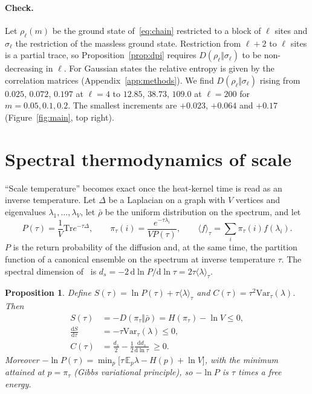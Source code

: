 \documentclass[11pt]{article}
\newtheorem{proposition}{Proposition}[section]
\theoremstyle{remark}\newtheorem*{remark}{Remark}
\newcommand{\dd}{\mathrm{d}}
\newcommand{\Tr}{\mathrm{Tr}}
\newcommand{\Var}{\mathrm{Var}}
\begin{document}
\paragraph{Check.}
Let $\rho_\ell(m)$ be the ground state of~\eqref{eq:chain} restricted to a block of $\ell$ sites and $\sigma_\ell$
the restriction of the massless ground state. Restriction from $\ell+2$ to $\ell$ sites is a partial trace, so
Proposition~\ref{prop:dpi} requires $D(\rho_\ell\Vert\sigma_\ell)$ to be non-decreasing in $\ell$. For Gaussian states
the relative entropy is given by the correlation matrices (Appendix~\ref{app:methods}). We find
$D(\rho_\ell\Vert\sigma_\ell)$ rising from $0.025$, $0.072$, $0.197$ at $\ell=4$ to $12.85$, $38.73$, $109.0$ at
$\ell=200$ for $m=0.05,0.1,0.2$. The smallest increments are $+0.023$, $+0.064$ and $+0.17$
(Figure~\ref{fig:main}, top right).

\section{Spectral thermodynamics of scale}
\label{sec:spectral}

``Scale temperature'' becomes exact once the heat-kernel time is read as an inverse temperature. Let $\Delta$ be
a Laplacian on a graph with $V$ vertices and eigenvalues $\lambda_1,\dots,\lambda_V$, let $\bar\rho$ be the uniform
distribution on the spectrum, and let
\begin{equation}
P(\tau)=\frac1V\Tr e^{-\tau\Delta},\qquad
\pi_\tau(i)=\frac{e^{-\tau\lambda_i}}{V P(\tau)},\qquad
\langle f\rangle_\tau=\sum_i\pi_\tau(i)f(\lambda_i).
\label{eq:gibbs}
\end{equation}
$P$ is the return probability of the diffusion and, at the same time, the partition function of a canonical
ensemble on the spectrum at inverse temperature $\tau$. The spectral dimension of~\cite{Chen2026_qgc} is
$d_s=-2\,\dd\ln P/\dd\ln\tau=2\tau\langle\lambda\rangle_\tau$.

\begin{proposition}
\label{prop:spectral}
Define $S(\tau)=\ln P(\tau)+\tau\langle\lambda\rangle_\tau$ and $C(\tau)=\tau^2\Var_\tau(\lambda)$. Then
\begin{align}
S(\tau)&=-D(\pi_\tau\Vert\bar\rho)=H(\pi_\tau)-\ln V\le0, \label{eq:S}\\
\frac{\dd S}{\dd\tau}&=-\tau\Var_\tau(\lambda)\le0, \label{eq:dS}\\
C(\tau)&=\frac{d_s}{2}-\frac12\frac{\dd d_s}{\dd\ln\tau}\ \ge0 . \label{eq:C}
\end{align}
Moreover $-\ln P(\tau)=\min_p\bigl[\tau\,\mathbb E_p\lambda-H(p)+\ln V\bigr]$, with the minimum attained at
$p=\pi_\tau$ (Gibbs variational principle), so $-\ln P$ is $\tau$ times a free energy.
\end{proposition}
\end{document}
